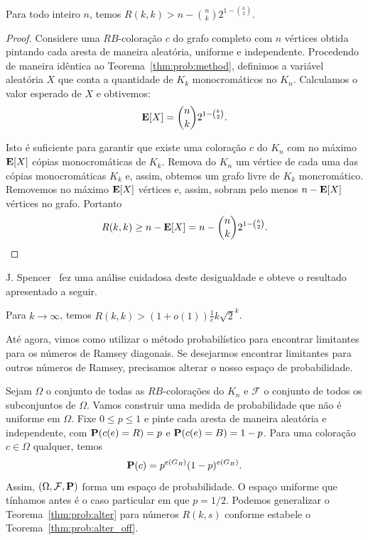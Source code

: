 \begin{theorem}
\label{thm:prob:alter}
Para todo inteiro $n$, temos $\displaystyle R(k,k) > n - \binom{n}{k}2^{1 - \binom{k}{2}}$.
\end{theorem}
\begin{proof}
Considere uma $RB$-coloração $c$ do grafo completo com $n$ vértices obtida pintando cada aresta de maneira aleatória, uniforme e independente. Procedendo de maneira idêntica ao Teorema~\ref{thm:prob:method}, definimos a variável aleatória $X$ que conta a quantidade de $K_k$ monocromáticos no $K_n$. Calculamos o valor esperado de $X$ e obtivemos:
\[ \operatorname{\mathbf{E}}[X] = \binom{n}{k} 2^{1 - \binom{k}{2}}. \]

Isto é suficiente para garantir que existe uma coloração $c$ do $K_n$ com no máximo $\operatorname{\mathbf{E}}[X]$ cópias monocromáticas de $K_k$. Remova do $K_n$ um vértice de cada uma das cópias monocromáticas $K_k$ e, assim, obtemos um grafo livre de $K_k$ moncromático. Removemos no máximo $\operatorname{\mathbf{E}}[X]$ vértices e, assim, sobram pelo menos $n - \operatorname{\mathbf{E}}[X]$ vértices no grafo. Portanto
\[ R(k,k) \geq n - \operatorname{\mathbf{E}}[X] = n - \binom{n}{k} 2^{1 - \binom{k}{2}}.  \qedhere\]
\end{proof}

J. Spencer~\cite{spencer2014asymptopia} fez uma análise cuidadosa deste desigualdade e obteve o resultado apresentado a seguir.

\begin{noproofcorollary}
Para $k \to \infty$, temos $\displaystyle R(k,k) > (1+o(1))\frac{1}{e}k\sqrt{2}^k$.
\end{noproofcorollary}

Até agora, vimos como utilizar o método probabilístico para encontrar limitantes para os números de Ramsey diagonais. Se desejarmos encontrar limitantes para outros números de Ramsey, precisamos alterar o nosso espaço de probabilidade.

Sejam $\Omega$ o conjunto de todas as $RB$-colorações do $K_n$ e $\mathcal{F}$ o conjunto de todos os subconjuntos de $\Omega$. Vamos construir uma medida de probabilidade que não é uniforme em $\Omega$. Fixe $0 \leq p \leq 1$ e pinte cada aresta de maneira aleatória e independente, com $\operatorname{\mathbf{P}}(c(e) = R) = p$ e $\operatorname{\mathbf{P}}(c(e) = B) = 1 - p$. Para uma coloração $c \in \Omega$ qualquer, temos
\[ \operatorname{\mathbf{P}}(c) =  p^{e(G_R)}(1-p)^{e(G_B)}.\]
Assim, $(\Omega, \mathcal{F}, \operatorname{\mathbf{P}})$ forma um espaço de probabilidade. O espaço uniforme que tínhamos antes é o caso particular em que $p = 1/2$. Podemos generalizar o Teorema~\ref{thm:prob:alter} para números $R(k,s)$ conforme estabele o Teorema~\ref{thm:prob:alter_off}.

